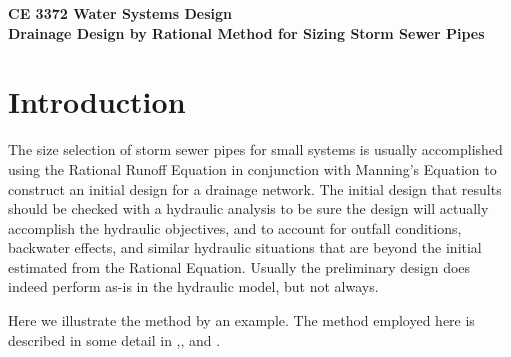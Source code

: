 \documentclass[12pt]{article}
\begin{document}
\begingroup
\begin{center}
{\textbf{{ CE 3372 Water Systems Design} \\  Drainage Design by Rational Method for Sizing Storm Sewer Pipes }}
\end{center}
\endgroup
\section*{Introduction}
The size selection of storm sewer pipes for small systems is usually accomplished using the Rational Runoff Equation in conjunction with Manning's Equation to construct an initial design for a drainage network.  
The initial design that results should be checked with a hydraulic analysis to be sure the design will actually accomplish the hydraulic objectives, and to account for outfall conditions, backwater effects, and similar hydraulic situations that are beyond the initial estimated from the Rational Equation.
Usually the preliminary design does indeed perform as-is in the hydraulic model, but not always.

Here we illustrate the method by an example.  
The method employed here is described in some detail in \cite{Wurbs2002},\cite{Chin2006}, and \cite{mays2011}.
\end{document}
